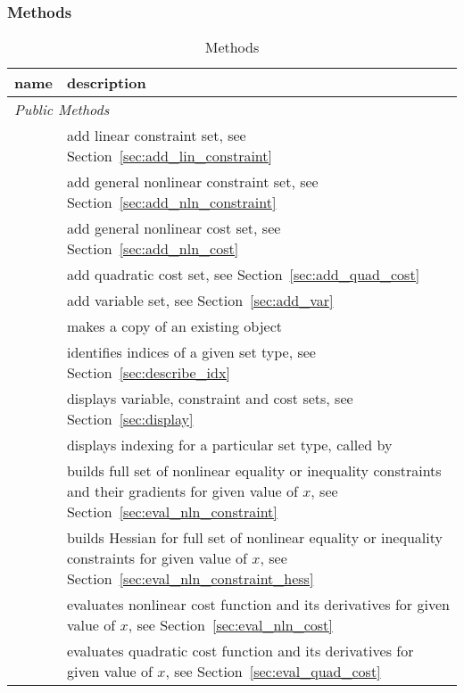 \documentclass[12pt]{article}
\newcommand{\code}[1]{{\relsize{-0.5}{\tt{{#1}}}}}  %
\numberwithin{equation}{section}
\numberwithin{table}{section}
\numberwithin{figure}{section}
\begin{document}
\subsubsection{Methods}

\begin{table}[!ht]
\centering
\begin{threeparttable}
\caption{\code{opt\_model} Methods}
\label{tab:methods}
\footnotesize
\begin{tabular}{lp{}}
\toprule
name & description \\
\midrule
\multicolumn{2}{l}{\emph{Public Methods}} \\
\code{~~add\_lin\_constraint}	& add linear constraint set, see Section~\ref{sec:add_lin_constraint}	\\
\code{~~add\_nln\_constraint}	& add general nonlinear constraint set, see Section~\ref{sec:add_nln_constraint}	\\
\code{~~add\_nln\_cost}	& add general nonlinear cost set, see Section~\ref{sec:add_nln_cost}	\\
\code{~~add\_quad\_cost}	& add quadratic cost set, see Section~\ref{sec:add_quad_cost}	\\
\code{~~add\_var}	& add variable set, see Section~\ref{sec:add_var}	\\
\code{~~copy}\tnote{\dag}	& makes a copy of an existing \code{opt\_model} object	\\
\code{~~describe\_idx}\tnote{\dag}	& identifies indices of a given set type, see Section~\ref{sec:describe_idx}	\\
\code{~~display}	& displays variable, constraint and cost sets, see Section~\ref{sec:display}	\\
\code{~~display\_set}\tnote{\dag}	& displays indexing for a particular set type, called by \code{display}	\\
\code{~~eval\_nln\_constraint}	& builds full set of nonlinear equality or inequality constraints and their gradients for given value of $x$, see Section~\ref{sec:eval_nln_constraint}	\\
\code{~~eval\_nln\_constraint\_hess}	& builds Hessian for full set of nonlinear equality or inequality constraints for given value of $x$, see Section~\ref{sec:eval_nln_constraint_hess}	\\
\code{~~eval\_nln\_cost}	& evaluates nonlinear cost function and its derivatives\tnote{\ddag} for given value of $x$, see Section~\ref{sec:eval_nln_cost}	\\
\code{~~eval\_quad\_cost}	& evaluates quadratic cost function and its derivatives\tnote{\ddag} for given value of $x$, see Section~\ref{sec:eval_quad_cost}	\\

\end{tabular}
\end{threeparttable}
\end{table}
\end{document}
